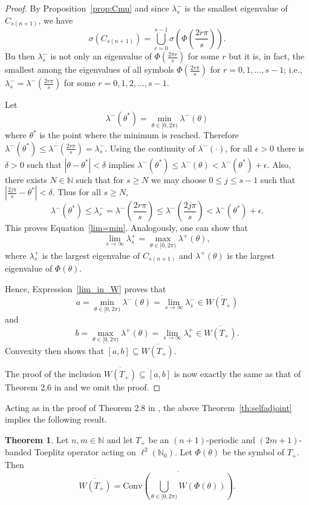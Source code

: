 \documentclass[12pt,reqno]{amsart}
\theoremstyle{definition}
\newtheorem{theorem}{Theorem}[section]
\newcommand{\ovl}[1]{\overline{#1}}	%
\newcommand{\parn}[1]{\left( #1 \right)}%
\newcommand{\conv}[1]{\mathrm{Conv}\parn{#1}}	%
\newcommand{\N}{{\mathbb{N}}}
\begin{document}
\begin{proof}
By Proposition~\ref{prop:Cmu} and  since $\lambda_s^-$ is the smallest eigenvalue of $C_{s(n+1)}$, we have 
\[
\sigma(C_{s(n+1)})=\bigcup_{r=0}^{s-1}\sigma\left(\Phi\left(\frac{2 r \pi }{s}\right)\right).
\]
Bu then $\lambda_s^-$ is not only an eigenvalue of $\Phi(\frac{2\pi r}{s})$ for some $r$ but it is, in
 fact, the smallest among the eigenvalues of all symbols $\Phi(\frac{2 r \pi}{s})$ for $r=0, 1, \dots, s-1$; i.e.,
 $\lambda^-_s=\lambda^-\left(\frac{2 r \pi}{s}\right)$ for some $r=0,1,2, \dots, s-1$.

Let 
\[ 
\lambda^-(\theta^*)=\min_{\theta\in[0,2\pi)}\lambda^-(\theta)
\]
where $\theta^*$ is the point where the minimum is reached.
Therefore $\lambda^-(\theta^*)\leq \lambda^-\left(\frac{2 r \pi}{s}\right)=\lambda_s^-$. Using the continuity of $\lambda^-(\cdot)$, for all 
$\epsilon>0$ there is $\delta>0$ such that $|\theta-\theta^*|<\delta$ implies
 $\lambda^-(\theta^*)\leq\lambda^-(\theta)<\lambda^-(\theta^*)+\epsilon$. Also, there exists $N \in \N$ such that for $s\geq N$ we may choose $0\leq j\leq s-1$ such that $\left|\frac{2 j \pi}{s} - \theta^*\right|<\delta$. Thus for all $s\geq N$, 
\[
  \lambda^-(\theta^*)\leq\lambda_s^-=\lambda^-\left(\frac{2 r \pi}{s}\right)\leq\lambda^-\left(\frac{2 j \pi}{s}\right)<\lambda^-(\theta^*)+\epsilon.
\]
This proves Equation~\eqref{lim=min}. Analogously, one can show that
\[
\lim_{s\to\infty}\lambda_s^+=\max_{\theta\in[0,2\pi)}\lambda^+(\theta),
\]
where $\lambda_s^+$ is the largest eigenvalue of $C_{s(n+1)}$ and $\lambda^+(\theta)$ is the largest eigenvalue of $\Phi(\theta)$. 

Hence, Expression~\eqref{lim_in_W} proves that
\[
  a= \min_{\theta\in[0,2\pi)}\lambda^-(\theta)=\lim_{s\to\infty}\lambda_s^-\in\overline{W(T_+)}
\]
and 
\[
  b= \max_{\theta\in[0,2\pi)}\lambda^+(\theta)=\lim_{s\to\infty}\lambda_s^+\in\overline{W(T_+)}.
\]
Convexity then shows that $[a,b]\subseteq \overline{W(T_+)}$. 

The proof of the inclusion $\overline{W(T_+)} \subseteq [a,b]$ is now exactly the same as that of Theorem 2.6 in \cite{IM} and we omit the proof.
\end{proof}


Acting as in the proof of Theorem 2.8 in \cite{IM}, 
the above Theorem~\ref{th:selfadjoint} implies the following result.

\begin{theorem}\label{th:numranT+}
Let $n, m \in \N$ and let $T_+$ be an $(n+1)$-periodic and $(2m+1)$-banded Toeplitz operator acting on $\ell^2 (\N_0)$. Let $\Phi(\theta)$ be the symbol of $T_+$. Then 
\[
   \overline{W(T_+)} =\ovl{ \conv{ \bigcup_{\theta \in [0, 2\pi)} W(\Phi(\theta))}}.
   \]
\end{theorem}
\end{document}
